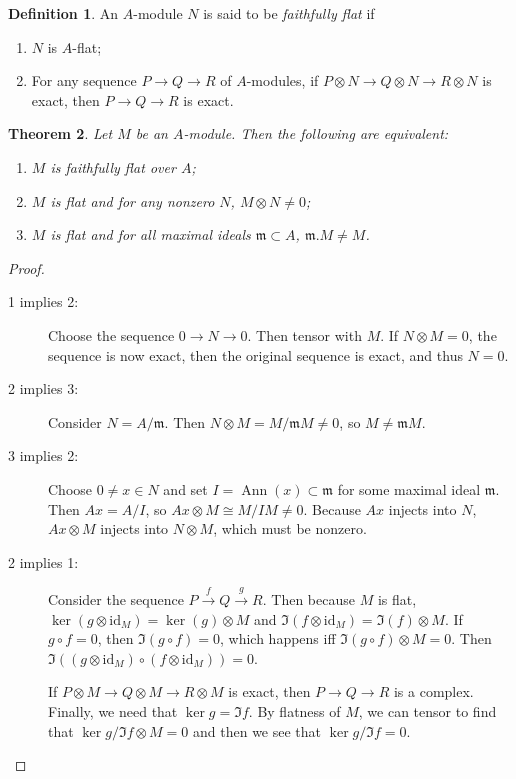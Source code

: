 \documentclass[leqno, openany]{memoir}
\newtheorem{thm}{Theorem}[section]
\theoremstyle{definition}
\newtheorem{defn}[thm]{Definition}
\theoremstyle{remark}
\theoremstyle{plain}
\theoremstyle{definition}
\theoremstyle{remark}
\newcommand{\mf}[1]{\mathfrak{#1}}
\newcommand{\mr}[1]{\mathrm{#1}}
\begin{document}
\begin{defn}
    An $A$-module $N$ is said to be \textit{faithfully flat} if
    \begin{enumerate}
        \item $N$ is $A$-flat;
        \item For any sequence $P \to Q \to R$ of $A$-modules, if $P \otimes N \to Q \otimes N \to R \otimes N$ is exact, then $P \to Q \to R$ is exact.
    \end{enumerate}
\end{defn}

\begin{thm}
    Let $M$ be an $A$-module. Then the following are equivalent:
    \begin{enumerate}
        \item $M$ is faithfully flat over $A$;
        \item $M$ is flat and for any nonzero $N$, $M \otimes N \neq 0$;
        \item $M$ is flat and for all maximal ideals $\mf{m} \subset A$, $\mf{m} . M \neq M$.
    \end{enumerate}
\end{thm}

\begin{proof}
    \begin{description}
        \item[1 implies 2:] Choose the sequence $0 \to N \to 0$. Then tensor with  $M$. If $N \otimes M = 0$, the sequence is now exact, then the original sequence is exact, and thus $N = 0$.
        \item[2 implies 3:] Consider $N = A/\mf{m}$. Then $N \otimes M = M / \mf{m}M \neq 0$, so $M \neq \mf{m}M$.
        \item[3 implies 2:] Choose $0 \neq x \in N$ and set $I = \operatorname{Ann}(x) \subset \mf{m}$ for some maximal ideal $\mf{m}$. Then $Ax = A/I$, so $Ax \otimes M \cong M / IM \neq 0$. Because $Ax$ injects into $N$, $Ax \otimes M$ injects into $N \otimes M$, which must be nonzero.
        \item[2 implies 1:] Consider the sequence $P \xrightarrow{f} Q \xrightarrow{g} R$. Then because $M$ is flat, $\ker(g \otimes \mr{id}_M) = \ker(g) \otimes M$ and $\Im(f \otimes \mr{id}_M) = \Im(f) \otimes M$. If $g \circ f = 0$, then $\Im(g \circ f) = 0$, which happens iff $\Im(g \circ f) \otimes M = 0$. Then $\Im((g \otimes \mr{id}_M) \circ (f \otimes \mr{id}_M)) = 0$. 
            
            If $P \otimes M \to Q \otimes M \to R \otimes M$ is exact, then $P \to Q \to R$ is a complex. Finally, we need that $\ker g = \Im f$. By flatness of $M$, we can tensor to find that $\ker g / \Im f \otimes M = 0$ and then we see that $\ker g / \Im f = 0$. \qedhere
    \end{description}
\end{proof}
\end{document}
